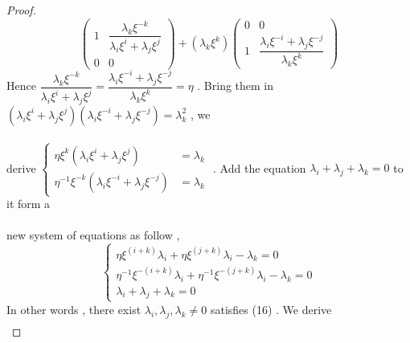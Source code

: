 \documentclass{article}
\begin{document}
\begin{proof}
\begin{equation*}
        \begin{pmatrix}
            1&\dfrac{\lambda_k\xi^{\scriptscriptstyle-k}}{\lambda_i\xi^{\scriptscriptstyle i}+\lambda_j\xi^{\scriptscriptstyle j}}\\
            0&0
        \end{pmatrix}+(\lambda_k\xi^{\scriptscriptstyle k})
        \begin{pmatrix}
            0&0\\
            1&\dfrac{\lambda_i\xi^{\scriptscriptstyle-i}+\lambda_j\xi^{\scriptscriptstyle-j}}{\lambda_k\xi^{\scriptscriptstyle k}}
        \end{pmatrix}
\end{equation*}
Hence $\dfrac{\lambda_k\xi^{\scriptscriptstyle-k}}{\lambda_i\xi^{\scriptscriptstyle i}+\lambda_j\xi^{\scriptscriptstyle j}}=\dfrac{\lambda_i\xi^{\scriptscriptstyle-i}+\lambda_j\xi^{\scriptscriptstyle-j}}{\lambda_k\xi^{\scriptscriptstyle k}}=\eta$ . Bring them in $(\lambda_i\xi^{\scriptscriptstyle i}+\lambda_j\xi^{\scriptscriptstyle j})(\lambda_i\xi^{\scriptscriptstyle-i}+\lambda_j\xi^{\scriptscriptstyle-j})=\lambda_k^{\scriptscriptstyle2}$ , we \\
\quad\\
derive 
$
\left\{
\begin{array}{ll}
\eta\xi^{\scriptscriptstyle k}(\lambda_i\xi^{\scriptscriptstyle i}+\lambda_j\xi^{\scriptscriptstyle j})&=\lambda_k\\
\eta^{\scriptscriptstyle-1}\xi^{\scriptscriptstyle -k}(\lambda_i\xi^{\scriptscriptstyle-i}+\lambda_j\xi^{\scriptscriptstyle-j})&=\lambda_k
\end{array}
\right.
$ . 
Add the equation $\lambda_i+\lambda_j+\lambda_k=0$ to it form a\\
\quad\\
new system of equations as follow ,
\begin{equation}
\begin{cases}
    \eta\xi^{\scriptscriptstyle (i+k)}\lambda_i+\eta\xi^{\scriptscriptstyle (j+k)}\lambda_i-\lambda_k=0\\
    \eta^{\scriptscriptstyle-1}\xi^{\scriptscriptstyle -(i+k)}\lambda_i+\eta^{\scriptscriptstyle-1}\xi^{\scriptscriptstyle -(j+k)}\lambda_i-\lambda_k=0\\
    \lambda_i+\lambda_j+\lambda_k=0
\end{cases}
\end{equation}
In other words , there exist $\lambda_i,\lambda_j,\lambda_k\neq0$ satisfies (16) . We derive
\begin{align*}

\end{align*}
\end{proof}
\end{document}
